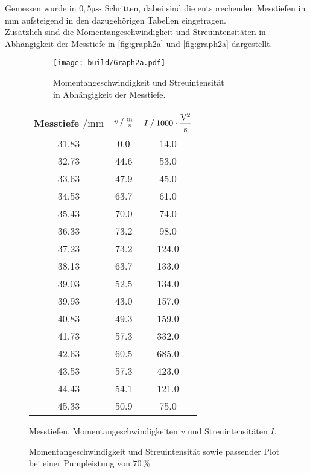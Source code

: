 Gemessen wurde in $0,5 \unit{\micro\second}$- Schritten, dabei sind die entsprechenden Messtiefen in $\unit{\milli\meter}$ aufsteigend in den dazugehörigen Tabellen eingetragen. \\

Zusätzlich sind die Momentangeschwindigkeit und Streuintensitäten in Abhängigkeit der Messtiefe in \autoref{fig:graph2a} und \autoref{fig:graph2a} dargestellt.

\begin{figure}[H]
    \begin{subfigure}{0.57\textwidth} 
        \centering
        \texttt{[image: build/Graph2a.pdf]} 
        \caption{Momentangeschwindigkeit und Streuintensität \\ in Abhängigkeit der Messtiefe.}
        \label{fig:graph2a}
        \qquad
    \end{subfigure}
    \begin{subtable}{0.43\textwidth}
        \centering
       \begin{tabular}{c c c}
        \toprule 
        {Messtiefe $\mathbin{/} \unit{\milli\meter}$} & {$v \mathbin{/} \unit{\frac{\meter}{\second}} $} & {$I \mathbin{/} 1000 \cdot \unit{\dfrac{\volt^2}{\second}}$}  \\
        \midrule 
           31.83     &      0.0     &     14.0    \\
           32.73     &     44.6     &     53.0    \\
           33.63     &     47.9     &     45.0    \\
           34.53     &     63.7     &     61.0    \\
           35.43     &     70.0     &     74.0    \\
           36.33     &     73.2     &     98.0    \\
           37.23     &     73.2     &    124.0    \\
           38.13     &     63.7     &    133.0    \\
           39.03     &     52.5     &    134.0    \\
           39.93     &     43.0     &    157.0    \\
           40.83     &     49.3     &    159.0    \\
           41.73     &     57.3     &    332.0    \\
           42.63     &     60.5     &    685.0    \\
           43.53     &     57.3     &    423.0    \\
           44.43     &     54.1     &    121.0    \\
           45.33     &     50.9     &     75.0    \\
        \bottomrule
       \end{tabular}
       \caption{Messtiefen, Momentangeschwindigkeiten $v$ und Streuintensitäten $I$.}
        \label{tab:2a}  
    \end{subtable}
    \caption{Momentangeschwindigkeit und Streuintensität sowie passender Plot bei einer Pumpleistung von $70 \,\%$} 
\end{figure}    


